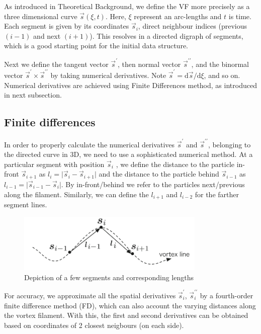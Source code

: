As introduced in Theoretical Background, we define the VF more precisely as a three dimensional curve $\vec{s}(\xi, t)$. Here, $\xi$ represent an arc-lengths and $t$ is time. Each segment is given by its coordinates $\vec{s}_i$, direct neighbour indices (previous $(i-1)$ and next $(i+1)$). This resolves in a directed digraph of segments, which is a good starting point for the initial data structure.

Next we define the tangent vector $\vec{s}^{\prime}$, then normal vector $\vec{s}^{\prime\prime}$, and the binormal vector $\vec{s}^{\prime} \times \vec{s}^{\prime\prime}$ by taking numerical derivatives. Note $\vec{s}^{\prime} = \text{d}\vec{s} / \text{d}\xi$,
and so on. Numerical derivatives are achieved using Finite Differences method, as introduced in next subsection.


\subsection*{Finite differences}

In order to properly calculate the numerical derivatives $\vec{s}^{\prime}$ and $\vec{s}^{\prime\prime}$, belonging to the directed curve in 3D, we need to use a sophisticated numerical method. At a particular segment with position $\vec{s}_i$ , we define the distance to the particle in-front $\vec{s}_{i+1}$ as $l_{i} = \vert \vec{s}_i - \vec{s}_{i+1} \vert$ and the distance to the particle behind
$\vec{s}_{i-1}$ as $l_{i-1} = \vert \vec{s}_{i-1} - \vec{s}_i \vert$.
By in-front/behind we refer to the particles next/previous along the filament. Similarly, we can define the $l_{i+1}$ and $l_{i-2}$ for the farther segment lines.

\begin{figure}[h]
	\centering
	\includegraphics[width=0.8\textwidth]{graphics/simul/finite-diff}
	\caption{Depiction of a few segments and corresponding lengths}
\end{figure}

For accuracy, we approximate all the spatial derivatives $\vec{s}_i^{\prime}$, $\vec{s}_i^{\prime\prime}$ by a
fourth-order finite difference method (FD), which can also account the
varying distances along the vortex filament. With this, the first and second derivatives can be obtained based on coordinates of 2 closest neigbours (on each side).

